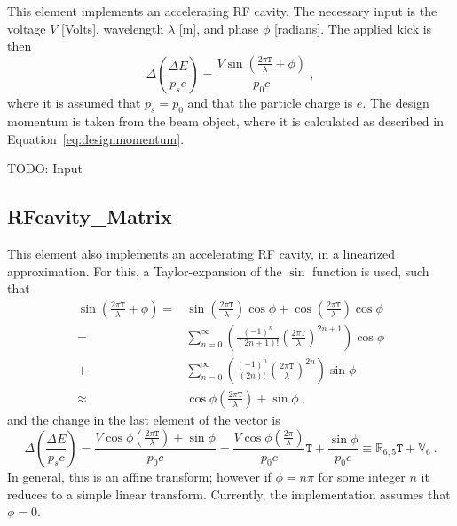 \documentclass[a4paper]{report}
\begin{document}
This element implements an accelerating RF cavity.
The necessary input is the voltage $V$ [Volts], wavelength $\lambda$ [m], and phase $\phi$ [radians].
The applied kick is then
\begin{equation}
  \Delta \left(\frac{\Delta E}{p_s c}\right) = \frac{V \sin\left(\frac{2\pi \mathtt{T} }{\lambda}+\phi\right)}{p_0 c}~,
\end{equation}
where it is assumed that $p_s = p_0$ and that the particle charge is $e$.
The design momentum is taken from the beam object, where it is calculated as described in Equation~\eqref{eq:designmomentum}.


TODO: Input

\subsection{RFcavity\_Matrix}

This element also implements an accelerating RF cavity, in a linearized approximation.
For this, a Taylor-expansion of the $\sin$ function is used, such that
\begin{equation}
  \begin{split}
    \sin\left(\frac{2\pi \mathtt{T} }{\lambda}+\phi\right) =& \sin\left(\frac{2\pi \mathtt{T} }{\lambda}\right)\cos\phi + \cos\left(\frac{2\pi \mathtt{T} }{\lambda}\right)\cos\phi \\
    =&
    \sum_{n=0}^\infty \left( \frac{(-1)^n}{(2n+1)!} \left(\frac{2\pi \mathtt{T}}{\lambda}\right)^{2n+1} \right) \cos\phi \\
    +& 
    \sum_{n=0}^\infty \left( \frac{(-1)^n}{(2n)!} \left(\frac{2\pi \mathtt{T}}{\lambda}\right)^{2n} \right) \sin\phi \\
    \approx& \cos\phi \left(\frac{2\pi \mathtt{T}}{\lambda}\right) + \sin\phi ~,
  \end{split}
\end{equation}
and the change in the last element of the vector is
\begin{equation}
  \Delta \left(\frac{\Delta E}{p_s c}\right) = \frac{V \cos\phi \left(\frac{2\pi \mathtt{T}}{\lambda}\right) + \sin\phi}{p_0 c} = \frac{V \cos\phi \left(\frac{2\pi }{\lambda}\right)}{p_0 c} \mathtt{T} + \frac{\sin\phi}{p_0c} \equiv \mathbb{R}_{6,5} \mathtt{T} + \mathbb{V}_6 ~.
\end{equation}
In general, this is an affine transform; however if $\phi = n\pi$ for some integer $n$ it reduces to a simple linear transform. Currently, the implementation assumes that $\phi = 0$.
\end{document}
